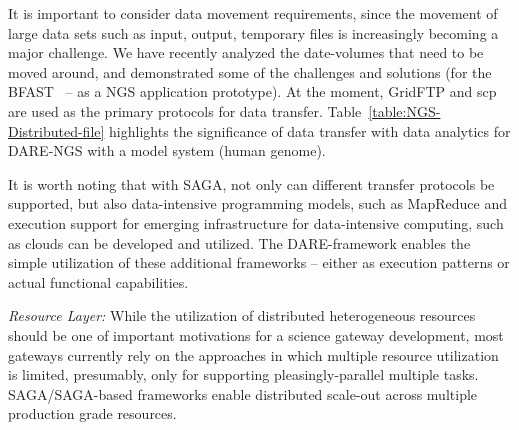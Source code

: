 \documentclass{sig-alternate}
\begin{document}



It is important to consider data movement requirements, since the
movement of large data sets such as input, output, temporary files is
increasingly becoming a major challenge. We have recently analyzed the
date-volumes that need to be moved around, and demonstrated some of
the challenges and solutions (for the BFAST~\cite{ecmls11} -- as a NGS
application prototype).  At the moment, GridFTP and scp are used as
the primary protocols for data
transfer. Table~\ref{table:NGS-Distributed-file} highlights the
significance of data transfer with data analytics for DARE-NGS with a
model system (human genome).

It is worth noting that with SAGA, not only can different transfer
protocols be supported, but also data-intensive programming models,
such as MapReduce and execution support for emerging infrastructure
for data-intensive computing, such as clouds can be developed and
utilized\cite{abstractions-azure,saga-ccgrid10}.  The DARE-framework
enables the simple utilization of these additional frameworks --
either as execution patterns or actual functional capabilities.

%

\textit{Resource Layer:} While the utilization of distributed
heterogeneous resources should be one of important motivations for a
science gateway development, most gateways currently rely on the
approaches in which multiple resource utilization is limited,
presumably, only for supporting pleasingly-parallel multiple tasks.
SAGA/SAGA-based frameworks enable distributed scale-out across
multiple production grade resources.
\end{document}
